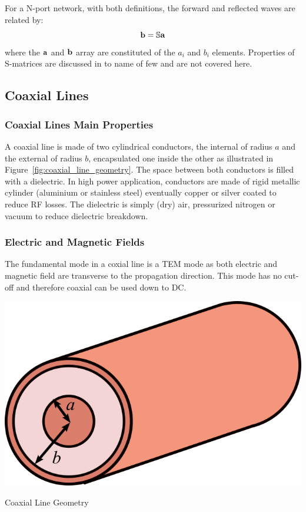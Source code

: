 For a N-port network, with both definitions, the forward and reflected waves are related by:
\begin{equation}
	{\mathbf b} = {\mathbb S} {\mathbf a}
\end{equation}
where the ${\mathbf a}$ and ${\mathbf b}$ array are constituted of the $a_i$ and $b_i$ elements. Properties of S-matrices are discussed in  to name of few and are not covered here.




\subsection{Coaxial Lines}\label{sec:coaxial_lines}
\subsubsection{Coaxial Lines Main Properties}
A coaxial line is made of two cylindrical conductors, the internal of radius $a$ and the external of radius $b$, encapsulated one inside the other as illustrated in Figure~\ref{fig:coaxial_line_geometry}. The space between both conductors is filled with a dielectric. In high power application, conductors are made of rigid metallic cylinder (aluminium or stainless steel) eventually copper or silver coated to reduce RF losses. The dielectric is simply (dry) air, pressurized nitrogen or vacuum to reduce dielectric breakdown. 

\subsubsection{Electric and Magnetic Fields}
The fundamental mode in a coxial line is a TEM mode as both electric and magnetic field are transverse to the propagation direction. This mode has no cut-off and therefore coaxial can be used down to DC.

\begin{marginfigure}[*-10]
	\includegraphics[width=1\linewidth]{figures/chap3/coaxial}
	\caption{Coaxial Line Geometry}
	\label{fig:coaxial_line_geometry}
\end{marginfigure}

